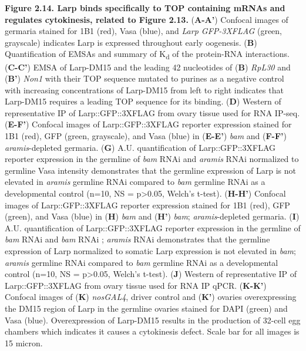 \documentclass[12pt,oneside]{reedthesis}
\begin{document}
\textbf{Figure 2.14. Larp binds specifically to TOP containing mRNAs and regulates cytokinesis, related to Figure 2.13.}
(\textbf{A-A'}) Confocal
images of germaria stained for 1B1 (red), Vasa (blue), and \emph{Larp
GFP-3XFLAG} (green, grayscale) indicates Larp is expressed throughout
early oogenesis. (\textbf{B}) Quantification of EMSAs and summary of K\textsubscript{d} of
the protein-RNA interactions. (\textbf{C-C'}) EMSA of Larp-DM15 and the
leading 42 nucleotides of (\textbf{B}) \emph{RpL30} and (\textbf{B'}) \emph{Non1} with their
TOP sequence mutated to purines as a negative control with increasing
concentrations of Larp-DM15 from left to right indicates that Larp-DM15
requires a leading TOP sequence for its binding. (\textbf{D}) Western of
representative IP of Larp::GFP::3XFLAG from ovary tissue used for RNA
IP-seq. (\textbf{E-F'}) Confocal images of Larp::GFP::3XFLAG reporter
expression stained for 1B1 (red), GFP (green, grayscale), and Vasa
(blue) in (\textbf{E-E'}) \emph{bam} and (\textbf{F-F'}) \emph{aramis}-depleted germaria.
(\textbf{G}) A.U. quantification of Larp::GFP::3XFLAG reporter expression in
the germline of \emph{bam} RNAi and \emph{aramis} RNAi normalized to germline Vasa
intensity demonstrates that the germline expression of Larp is not
elevated in \emph{aramis} germline RNAi compared to \emph{bam} germline RNAi as a
developmental control (n=10, NS = p\textgreater0.05, Welch's t-test). (\textbf{H-H'})
Confocal images of Larp::GFP::3XFLAG reporter expression stained for 1B1
(red), GFP (green), and Vasa (blue) in (\textbf{H}) \emph{bam} and (\textbf{H'}) \emph{bam};
\emph{aramis}-depleted germaria. (\textbf{I}) A.U. quantification of
Larp::GFP::3XFLAG reporter expression in the germline of \emph{bam} RNAi and
\emph{bam} RNAi ; \emph{aramis} RNAi demonstrates that the germline expression of
Larp normalized to somatic Larp expression is not elevated in \emph{bam};
\emph{aramis} germline RNAi compared to \emph{bam} germline RNAi as a
developmental control (n=10, NS = p\textgreater0.05, Welch's t-test). (\textbf{J})
Western of representative IP of Larp::GFP::3XFLAG from ovary tissue used
for RNA IP qPCR. (\textbf{K-K'}) Confocal images of (\textbf{K}) \emph{nosGAL4}, driver
control and (\textbf{K'}) ovaries overexpressing the DM15 region of Larp in
the germline ovaries stained for DAPI (green) and Vasa (blue).
Overexpression of Larp-DM15 results in the production of 32-cell egg
chambers which indicates it causes a cytokinesis defect. Scale bar for
all images is 15 micron.

\textbf{\hfill\break
}
\end{document}
